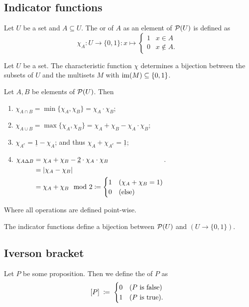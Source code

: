 \subsection{Indicator functions}
\begin{definition}
Let $U$ be a set and $A\subseteq U$. The  or  of $A$ as an element of $\operatorname{\mathcal{P}}(U)$ is defined as
\[ \chi_A: U\to \{0,1\}: x\mapsto \begin{cases}
1 & x\in A \\ 0 & x\notin A.
\end{cases} \]
\end{definition}

\begin{lemma}
Let $U$ be a set. The characteristic function $\chi$ determines a bijection between the subsets of $U$ and the multisets $M$ with $\operatorname{im}(M)\subseteq \{0,1\}$.
\end{lemma}

\begin{lemma}
Let $A,B$ be elements of $\operatorname{\mathcal{P}}(U)$. Then
\begin{enumerate}
\item $\chi_{A\cap B} = \min\{\chi_A,\chi_B\} = \chi_A\cdot \chi_B$;
\item $\chi_{A\cup B} = \max\{\chi_A,\chi_B\} = \chi_A + \chi_B - \chi_A\cdot \chi_B$;
\item $\chi_{A^c} = \underline{1}-\chi_A$; and thus $\chi_A + \chi_{A^c} = \underline{1}$;
\item $\chi_{A\Delta B} \begin{aligned}[t] &= \chi_A + \chi_B - \underline{2}\cdot\chi_A\cdot \chi_B \\
&= |\chi_A - \chi_B| \\
&= \chi_A + \chi_B \mod 2 \coloneqq \begin{cases}
1 & (\chi_A + \chi_B = 1) \\
0 & \text{(else)}
\end{cases}
\end{aligned}$.
\end{enumerate}
Where all operations are defined point-wise.
\end{lemma}

\begin{proposition}
The indicator functions define a bijection between $\operatorname{\mathcal{P}}(U)$ and $(U\to \{0,1\})$.
\end{proposition}

\subsection{Iverson bracket}
\begin{definition}
Let $P$ be some proposition. Then we define the  of $P$ as
\[ [P] \;\coloneqq\; \begin{cases}
0 & (\text{$P$ is false}) \\
1 & (\text{$P$ is true}).
\end{cases} \]
\end{definition}


